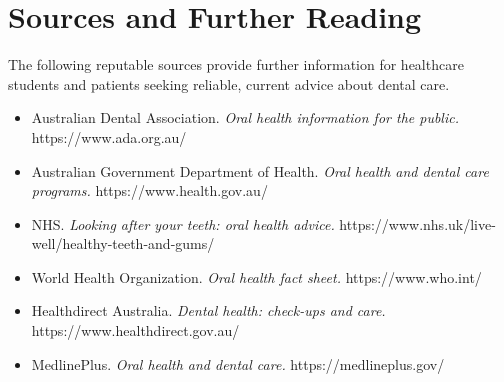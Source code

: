 \section*{Sources and Further Reading}
The following reputable sources provide further information for healthcare students and patients seeking reliable, current advice about dental care.

\begin{itemize}
    \item Australian Dental Association. \textit{Oral health information for the public.} https://www.ada.org.au/
    \item Australian Government Department of Health. \textit{Oral health and dental care programs.} https://www.health.gov.au/
    \item NHS. \textit{Looking after your teeth: oral health advice.} https://www.nhs.uk/live-well/healthy-teeth-and-gums/
    \item World Health Organization. \textit{Oral health fact sheet.} https://www.who.int/
    \item Healthdirect Australia. \textit{Dental health: check-ups and care.} https://www.healthdirect.gov.au/
    \item MedlinePlus. \textit{Oral health and dental care.} https://medlineplus.gov/
\end{itemize}
